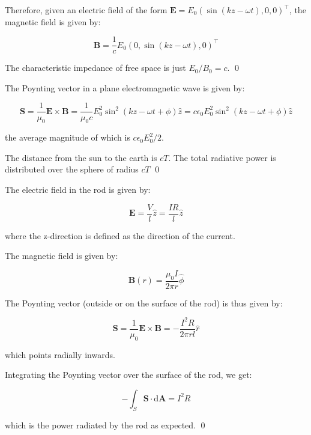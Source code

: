 \documentclass[12pt]{article}
\begin{document}
Therefore, given an electric field of the form $\mathbf{E} = E_{0}(\sin{(kz - \omega t)}, 0, 0)^{\intercal}$, the magnetic field is given by:

\begin{equation}
    \mathbf{B} = \frac{1}{c} E_{0}(0, \sin{(kz - \omega t)}, 0)^{\intercal}
\end{equation}

The characteristic impedance of free space is just $E_{0}/B_{0} = c$.
\qed



The Poynting vector in a plane electromagnetic wave is given by:

\begin{equation}
    \mathbf{S} = \frac{1}{\mu_{0}} \mathbf{E} \times \mathbf{B} = \frac{1}{\mu_{0}c} E_{0}^{2} \sin^{2}{(kz - \omega t + \phi)} \hat{z} = c \epsilon_{0} E_{0}^{2} \sin^{2}{(kz - \omega t + \phi)} \hat{z}
\end{equation}

the average magnitude of which is $c \epsilon_{0} E_{0}^{2}/2$.

The distance from the sun to the earth is $cT$. The total radiative power is distributed over the sphere of radius $cT$
\qed


The electric field in the rod is given by:

\begin{equation}
    \mathbf{E} = \frac{V}{l} \hat{z} = \frac{IR}{l} \hat{z}
\end{equation}

where the z-direction is defined as the direction of the current.

The magnetic field is given by:

\begin{equation}
    \mathbf{B}(r) = \frac{\mu_{0}I}{2\pi r} \hat{\phi}
\end{equation}

The Poynting vector (outside or on the surface of the rod) is thus given by:

\begin{equation}
    \mathbf{S} = \frac{1}{\mu_{0}} \mathbf{E} \times \mathbf{B} = -\frac{I^{2}R}{2\pi rl} \hat{r}
\end{equation}

which points radially inwards.

Integrating the Poynting vector over the surface of the rod, we get:

\begin{equation}
    -\int_{S} \mathbf{S} \cdot \mathrm{d}\mathbf{A} = I^{2}R
\end{equation}

which is the power radiated by the rod as expected.
\qed
\end{document}
